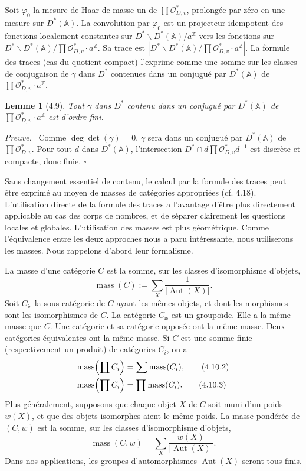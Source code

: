 \documentclass[10pt]{article}
\newcommand{\Z}{\mathbb Z}
\newcommand{\Adele}{\mathbb A}
\newcommand{\Aut}{\operatorname{Aut}}
\newcommand{\degm}{\operatorname{deg}}
\newcommand{\detm}{\operatorname{det}}
\newcommand{\mass}{\operatorname{mass}}
\theoremstyle{deligne}
\newtheorem*{lemma*}{Lemme}
\newenvironment{proofdel}[1][Preuve.]{\textit{#1}\ }{\hfill$\square$}
\newcommand{\heading}[1]{\vspace{0.7em}\noindent{\bfseries #1}\quad}
\begin{document}
\heading{4.8.} Soit $\varphi_0$ la mesure de Haar de masse un de $\prod\mathcal O_{D,v}^*$, prolongée par zéro en une mesure sur $D^*(\Adele)$. La convolution par $\varphi_0$ est un projecteur idempotent des fonctions localement constantes sur $D^*\backslash D^*(\Adele)/a^\Z$ vers les fonctions sur $D^*\backslash D^*(\Adele)/\prod\mathcal O_{D,v}^*\cdot a^\Z$. Sa trace est $|D^*\backslash D^*(\Adele)/\prod\mathcal O_{D,v}^*\cdot a^\Z|$. La formule des traces (cas du quotient compact) l'exprime comme une somme sur les classes de conjugaison de $\gamma$ dans $D^*$ contenues dans un conjugué par $D^*(\Adele)$ de $\prod\mathcal O_{D,v}^*\cdot a^\Z$.

\begin{lemma*}[4.9]
Tout $\gamma$ dans $D^*$ contenu dans un conjugué par $D^*(\Adele)$ de $\prod\mathcal O_{D,v}^*\cdot a^\Z$ est d'ordre fini.
\end{lemma*}

\begin{proofdel}
Comme $\degm\detm(\gamma)=0$, $\gamma$ sera dans un conjugué par $D^*(\Adele)$ de $\prod\mathcal O_{D,v}^*$. Pour tout $d$ dans $D^*(\Adele)$, l'intersection $D^*\cap d\prod\mathcal O_{D,v}^*d^{-1}$ est discrète et compacte, donc finie.
\end{proofdel}

Sans changement essentiel de contenu, le calcul par la formule des traces peut être exprimé au moyen de masses de catégories appropriées (cf. 4.18). L'utilisation directe de la formule des traces a l'avantage d'être plus directement applicable au cas des corps de nombres, et de séparer clairement les questions locales et globales. L'utilisation des masses est plus géométrique. Comme l'équivalence entre les deux approches nous a paru intéressante, nous utiliserons les masses. Nous rappelons d'abord leur formalisme.

\heading{4.10.} La masse d'une catégorie $C$ est la somme, sur les classes d'isomorphisme d'objets,
\begin{equation}\tag{4.10.1}
\mass(C):=\sum_X \frac{1}{|\Aut(X)|}.
\end{equation}
Soit $C_{\mathrm{is}}$ la sous-catégorie de $C$ ayant les mêmes objets, et dont les morphismes sont les isomorphismes de $C$. La catégorie $C_{\mathrm{is}}$ est un groupoïde. Elle a la même masse que $C$. Une catégorie et sa catégorie opposée ont la même masse. Deux catégories équivalentes ont la même masse. Si $C$ est une somme finie (respectivement un produit) de catégories $C_i$, on a
\begin{align}
\mass\Bigl(\coprod C_i\Bigr)&=\sum \mass(C_i), \tag{4.10.2}\\
\mass\Bigl(\prod C_i\Bigr)&=\prod \mass(C_i). \tag{4.10.3}
\end{align}
Plus généralement, supposons que chaque objet $X$ de $C$ soit muni d'un poids $w(X)$, et que des objets isomorphes aient le même poids. La masse pondérée de $(C,w)$ est la somme, sur les classes d'isomorphisme d'objets,
\begin{equation}\tag{4.10.4}
\mass(C,w)=\sum_X \frac{w(X)}{|\Aut(X)|}.
\end{equation}
Dans nos applications, les groupes d'automorphismes $\Aut(X)$ seront tous finis.
\end{document}
